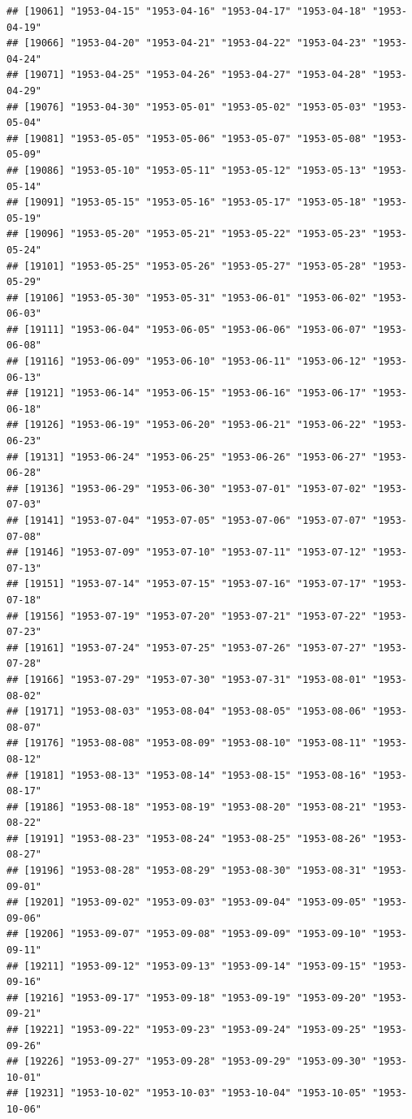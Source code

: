 \documentclass{article}\usepackage[]{graphicx}\usepackage[]{color}
\makeatletter
\newenvironment{kframe}{%
 \def\at@end@of@kframe{}%
 \ifinner\ifhmode%
  \def\at@end@of@kframe{\end{minipage}}%
  \begin{minipage}{\columnwidth}%
 \fi\fi%
 \def\FrameCommand##1{\hskip\@totalleftmargin \hskip-\fboxsep
 \colorbox{shadecolor}{##1}\hskip-\fboxsep
     \hskip-\linewidth \hskip-\@totalleftmargin \hskip\columnwidth}%
 \MakeFramed {\advance\hsize-\width
   \@totalleftmargin\z@ \linewidth\hsize
   \@setminipage}}%
 {\par\unskip\endMakeFramed%
 \at@end@of@kframe}
\newenvironment{knitrout}{}{} %
\makeatother
\begin{document}
\begin{description}
\begin{knitrout}
\begin{kframe}
\begin{verbatim}
## [19061] "1953-04-15" "1953-04-16" "1953-04-17" "1953-04-18" "1953-04-19"
## [19066] "1953-04-20" "1953-04-21" "1953-04-22" "1953-04-23" "1953-04-24"
## [19071] "1953-04-25" "1953-04-26" "1953-04-27" "1953-04-28" "1953-04-29"
## [19076] "1953-04-30" "1953-05-01" "1953-05-02" "1953-05-03" "1953-05-04"
## [19081] "1953-05-05" "1953-05-06" "1953-05-07" "1953-05-08" "1953-05-09"
## [19086] "1953-05-10" "1953-05-11" "1953-05-12" "1953-05-13" "1953-05-14"
## [19091] "1953-05-15" "1953-05-16" "1953-05-17" "1953-05-18" "1953-05-19"
## [19096] "1953-05-20" "1953-05-21" "1953-05-22" "1953-05-23" "1953-05-24"
## [19101] "1953-05-25" "1953-05-26" "1953-05-27" "1953-05-28" "1953-05-29"
## [19106] "1953-05-30" "1953-05-31" "1953-06-01" "1953-06-02" "1953-06-03"
## [19111] "1953-06-04" "1953-06-05" "1953-06-06" "1953-06-07" "1953-06-08"
## [19116] "1953-06-09" "1953-06-10" "1953-06-11" "1953-06-12" "1953-06-13"
## [19121] "1953-06-14" "1953-06-15" "1953-06-16" "1953-06-17" "1953-06-18"
## [19126] "1953-06-19" "1953-06-20" "1953-06-21" "1953-06-22" "1953-06-23"
## [19131] "1953-06-24" "1953-06-25" "1953-06-26" "1953-06-27" "1953-06-28"
## [19136] "1953-06-29" "1953-06-30" "1953-07-01" "1953-07-02" "1953-07-03"
## [19141] "1953-07-04" "1953-07-05" "1953-07-06" "1953-07-07" "1953-07-08"
## [19146] "1953-07-09" "1953-07-10" "1953-07-11" "1953-07-12" "1953-07-13"
## [19151] "1953-07-14" "1953-07-15" "1953-07-16" "1953-07-17" "1953-07-18"
## [19156] "1953-07-19" "1953-07-20" "1953-07-21" "1953-07-22" "1953-07-23"
## [19161] "1953-07-24" "1953-07-25" "1953-07-26" "1953-07-27" "1953-07-28"
## [19166] "1953-07-29" "1953-07-30" "1953-07-31" "1953-08-01" "1953-08-02"
## [19171] "1953-08-03" "1953-08-04" "1953-08-05" "1953-08-06" "1953-08-07"
## [19176] "1953-08-08" "1953-08-09" "1953-08-10" "1953-08-11" "1953-08-12"
## [19181] "1953-08-13" "1953-08-14" "1953-08-15" "1953-08-16" "1953-08-17"
## [19186] "1953-08-18" "1953-08-19" "1953-08-20" "1953-08-21" "1953-08-22"
## [19191] "1953-08-23" "1953-08-24" "1953-08-25" "1953-08-26" "1953-08-27"
## [19196] "1953-08-28" "1953-08-29" "1953-08-30" "1953-08-31" "1953-09-01"
## [19201] "1953-09-02" "1953-09-03" "1953-09-04" "1953-09-05" "1953-09-06"
## [19206] "1953-09-07" "1953-09-08" "1953-09-09" "1953-09-10" "1953-09-11"
## [19211] "1953-09-12" "1953-09-13" "1953-09-14" "1953-09-15" "1953-09-16"
## [19216] "1953-09-17" "1953-09-18" "1953-09-19" "1953-09-20" "1953-09-21"
## [19221] "1953-09-22" "1953-09-23" "1953-09-24" "1953-09-25" "1953-09-26"
## [19226] "1953-09-27" "1953-09-28" "1953-09-29" "1953-09-30" "1953-10-01"
## [19231] "1953-10-02" "1953-10-03" "1953-10-04" "1953-10-05" "1953-10-06"

\end{verbatim}
\end{kframe}
\end{knitrout}
\end{description}
\end{document}
